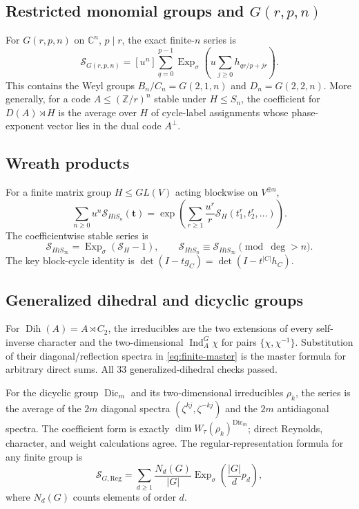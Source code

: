 \documentclass[10pt]{article}
\newcommand{\ExpS}{\operatorname{Exp}_{\sigma}}
\newcommand{\MGF}{\mathcal S}
\newcommand{\C}{\mathbb C}
\begin{document}
\subsection{Restricted monomial groups and $G(r,p,n)$}
For $G(r,p,n)$ on $\C^n$, $p\mid r$, the exact finite-$n$ series is
\begin{equation}\label{eq:grp}
\boxed{\MGF_{G(r,p,n)}=[u^n]\sum_{q=0}^{p-1}
 \ExpS\!\left(u\sum_{j\ge0}h_{qr/p+jr}\right).}
\end{equation}
This contains the Weyl groups $B_n/C_n=G(2,1,n)$ and $D_n=G(2,2,n)$.
More generally, for a code $A\le(\mathbb Z/r)^n$ stable under $H\le S_n$,
the coefficient for $D(A)\rtimes H$ is the average over $H$ of cycle-label
assignments whose phase-exponent vector lies in the dual code $A^\perp$.

\subsection{Wreath products}
For a finite matrix group $H\le GL(V)$ acting blockwise on $V^{\oplus n}$,
\begin{equation}\label{eq:wreath}
\boxed{\sum_{n\ge0}u^n\MGF_{H\wr S_n}(\mathbf t)
=\exp\!\left(\sum_{r\ge1}\frac{u^r}{r}
 \MGF_H(t_1^r,t_2^r,\ldots)\right).}
\end{equation}
The coefficientwise stable series is
\[
\MGF_{H\wr S_\infty}=\ExpS(\MGF_H-1),
\qquad \MGF_{H\wr S_n}\equiv\MGF_{H\wr S_\infty}\pmod{\deg>n}.
\]
The key block-cycle identity is
$\det(I-tg_C)=\det(I-t^{|C|}h_C)$.

\subsection{Generalized dihedral and dicyclic groups}
For $\operatorname{Dih}(A)=A\rtimes C_2$, the irreducibles are the two
extensions of every self-inverse character and the two-dimensional
$\operatorname{Ind}_A^G\chi$ for pairs $\{\chi,\chi^{-1}\}$. Substitution of
their diagonal/reflection spectra in \eqref{eq:finite-master} is the master
formula for arbitrary direct sums. All 33 generalized-dihedral checks passed.

For the dicyclic group $\operatorname{Dic}_m$ and its two-dimensional
irreducibles $\rho_k$, the series is the average of the $2m$ diagonal spectra
$(\zeta^{kj},\zeta^{-kj})$ and the $2m$ antidiagonal spectra. The coefficient
form is exactly $\dim W_\tau(\rho_k)^{\operatorname{Dic}_m}$; direct Reynolds,
character, and weight calculations agree. The regular-representation formula
for any finite group is
\begin{equation}\label{eq:regular}
\boxed{\MGF_{G,\mathrm{Reg}}=
 \sum_{d\ge1}\frac{N_d(G)}{|G|}\ExpS\!\left(\frac{|G|}{d}p_d\right),}
\end{equation}
where $N_d(G)$ counts elements of order $d$.
\end{document}
